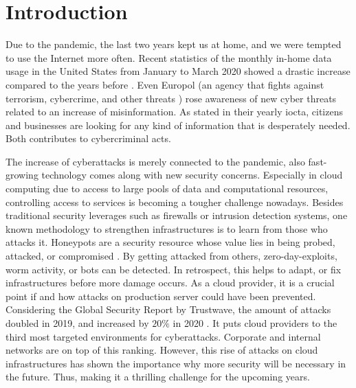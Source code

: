 \chapter{Introduction}


Due to the pandemic, the last two years kept us at home, and we were tempted to use the Internet more often.
Recent statistics of the monthly in-home data usage in the United States from January to March 2020 showed a drastic increase compared to the years before \cite{statista2021}.
Even Europol (an agency that fights against terrorism, cybercrime, and other threats \cite{europol2021}) rose awareness of new cyber threats related to an increase of misinformation.
As stated in their yearly \ac{iocta}, citizens and businesses are looking for any kind of information that is desperately needed.
Both contributes to cybercriminal acts. \cite{iocta2020}

The increase of cyberattacks is merely connected to the pandemic, also fast-growing technology comes along with new security concerns.
Especially in cloud computing due to access to large pools of data and computational resources, controlling access to services is becoming a tougher challenge nowadays.
Besides traditional security leverages such as firewalls or intrusion detection systems, one known methodology to strengthen infrastructures is to learn from those who attacks it.
Honeypots are a security resource whose value lies in being probed, attacked, or compromised \cite{Spitzner2003}.
By getting attacked from others, zero-day-exploits, worm activity, or bots can be detected.
In retrospect, this helps to adapt, or fix infrastructures before more damage occurs.
As a cloud provider, it is a crucial point if and how attacks on production server could have been prevented.
Considering the Global Security Report by Trustwave, the amount of attacks doubled in 2019, and increased by $20\%$ in 2020 \cite{fahim2020}.
It puts cloud providers to the third most targeted environments for cyberattacks.
Corporate and internal networks are on top of this ranking.
However, this rise of attacks on cloud infrastructures has shown the importance why more security will be necessary in the future.
Thus, making it a thrilling challenge for the upcoming years.



